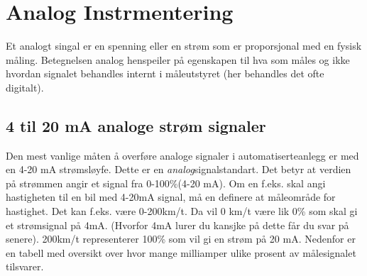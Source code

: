 \chapter{Analog Instrmentering}

Et analogt singal er en spenning eller en strøm som er proporsjonal med en fysisk måling. Betegnelsen analog henspeiler på egenskapen til hva som måles og ikke hvordan signalet behandles internt i måleutstyret (her behandles det ofte digitalt). 


\section{4 til 20 mA analoge strøm signaler }

Den mest vanlige måten å overføre analoge signaler i automatiserteanlegg er med en 4-20 mA strømsløyfe. Dette er en \textit{analog}signalstandart. Det betyr at verdien på  strømmen angir et signal fra 0-100\%(4-20 mA). Om en f.eks. skal angi hastigheten til en bil med 4-20mA signal, må en definere at måleområde for hastighet. Det kan f.eks. være 0-200km/t. Da vil 0 km/t være lik 0\% som skal gi et strømsignal på 4mA. (Hvorfor 4mA lurer du kansjke på dette får du svar på senere). 200km/t representerer 100\% som vil gi en strøm på 20 mA. Nedenfor er en tabell med oversikt over hvor mange milliamper ulike prosent av målesignalet tilsvarer. 


